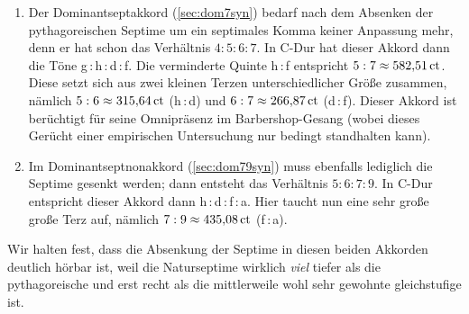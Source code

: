 \begin{enumerate}
\item Der Dominantseptakkord (\cref{sec:dom7syn}) bedarf nach dem Absenken der
  pythagoreischen Septime um ein septimales Komma keiner Anpassung mehr, denn er
  hat schon das Verhältnis $4:5:6:7$. In C-Dur hat dieser Akkord dann die Töne
  g\,:\,\naturalm h\,:\,d\,:\,\septimal f.  Die verminderte Quinte \naturalm
  h\,:\,\septimal f entspricht $5:7 \approx 582{,}51\,\text{ct}$.  Diese setzt sich aus
  zwei kleinen Terzen unterschiedlicher Größe zusammen, nämlich
  $5:6 \approx 315{,}64\,\text{ct}$ (\naturalm h\,:\,d) und $6:7\approx 266{,}87\,\text{ct}$
  (d\,:\,\septimal f).  Dieser Akkord ist berüchtigt für seine Omnipräsenz im
  Barbershop-Gesang (wobei dieses Gerücht einer empirischen Untersuchung
  \cite{Barbershop} nur bedingt standhalten kann).  
\item Im Dominantseptnonakkord (\cref{sec:dom79syn}) muss ebenfalls lediglich
  die Septime gesenkt werden; dann entsteht das Verhältnis $5:6:7:9$. In C-Dur
  entspricht dieser Akkord dann \naturalm h\,:\,d\,:\,\septimal f\,:\,a.  Hier
  taucht nun eine sehr große große Terz auf, nämlich $7:9\approx 435{,}08\,\text{ct}$
  (\septimal f\,:\,a).
\end{enumerate}
Wir halten fest, dass die Absenkung der Septime in diesen beiden Akkorden
deutlich hörbar ist, weil die Naturseptime wirklich \emph{viel} tiefer als die
pythagoreische und erst recht als die mittlerweile wohl sehr gewohnte
gleichstufige ist.

